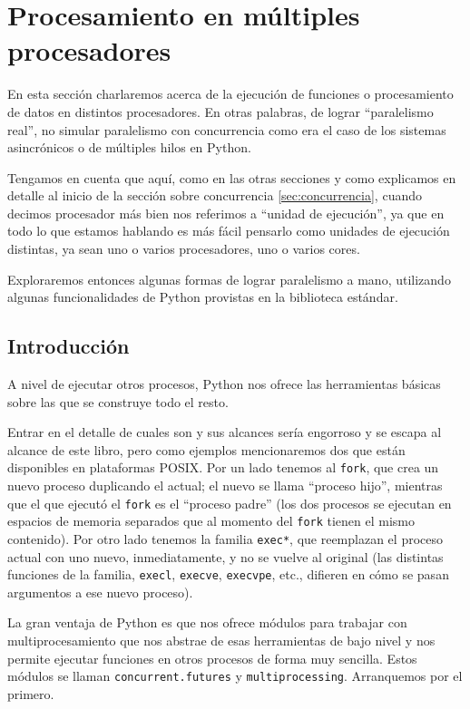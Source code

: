 \section{Procesamiento en múltiples procesadores}\label{sec:multiprocessing}

En esta sección charlaremos acerca de la ejecución de funciones o procesamiento de datos en distintos procesadores. En otras palabras, de lograr ``paralelismo real'', no simular paralelismo con concurrencia como era el caso de los sistemas asincrónicos o de múltiples hilos en Python.

Tengamos en cuenta que aquí, como en las otras secciones y como explicamos en detalle al inicio de la sección sobre concurrencia \ref{sec:concurrencia}, cuando decimos procesador más bien nos referimos a ``unidad de ejecución'', ya que en todo lo que estamos hablando es más fácil pensarlo como unidades de ejecución distintas, ya sean uno o varios procesadores, uno o varios cores.

Exploraremos entonces algunas formas de lograr paralelismo a mano, utilizando algunas funcionalidades de Python provistas en la biblioteca estándar.


\subsection{Introducción}

A nivel de ejecutar otros procesos, Python nos ofrece las herramientas básicas sobre las que se construye todo el resto. 

Entrar en el detalle de cuales son y sus alcances sería engorroso y se escapa al alcance de este libro, pero como ejemplos mencionaremos dos que están disponibles en plataformas POSIX. Por un lado tenemos al \texttt{fork}, que crea un nuevo proceso duplicando el actual; el nuevo se llama ``proceso hijo'', mientras que el que ejecutó el \texttt{fork} es el ``proceso padre'' (los dos procesos se ejecutan en espacios de memoria separados que al momento del \texttt{fork} tienen el mismo contenido). Por otro lado tenemos la familia \texttt{exec*}, que reemplazan el proceso actual con uno nuevo, inmediatamente, y no se vuelve al original (las distintas funciones de la familia, \texttt{execl}, \texttt{execve}, \texttt{execvpe}, etc., difieren en cómo se pasan argumentos a ese nuevo proceso).

La gran ventaja de Python es que nos ofrece módulos para trabajar con multiprocesamiento que nos abstrae de esas herramientas de bajo nivel y nos permite ejecutar funciones en otros procesos de forma muy sencilla. Estos módulos se llaman \texttt{concurrent.futures} y \texttt{multiprocessing}. Arranquemos por el primero.

